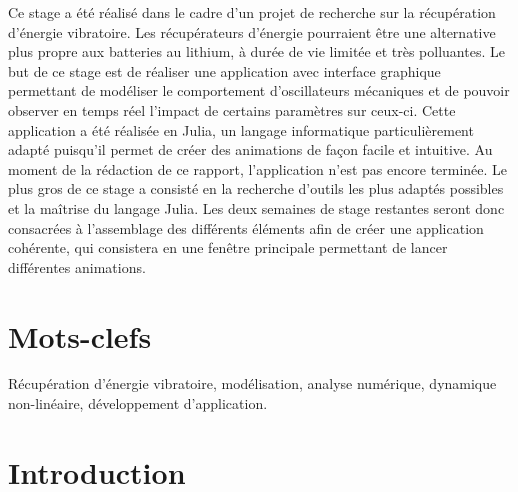 \documentclass[a4paper, french, 12pt, titlepage]{article}
\begin{document}
Ce stage a été réalisé dans le cadre d'un projet de recherche sur la récupération d'énergie vibratoire.
Les récupérateurs d'énergie pourraient être une alternative plus propre aux batteries au lithium, à durée de vie limitée et très polluantes. Le but de ce stage est de réaliser une application avec interface graphique permettant de modéliser le comportement d'oscillateurs mécaniques et de pouvoir observer en temps réel l'impact de certains paramètres sur ceux-ci.
Cette application a été réalisée en Julia, un langage informatique particulièrement adapté puisqu'il permet de créer des animations de façon facile et intuitive. Au moment de la rédaction de ce rapport, l'application n'est pas encore terminée.
Le plus gros de ce stage a consisté en la recherche d'outils les plus adaptés possibles et la maîtrise du langage Julia. Les deux semaines de stage restantes seront donc consacrées à l'assemblage des différents éléments afin de créer une application cohérente, qui consistera en une fenêtre principale permettant de lancer différentes animations.



\section*{Mots-clefs}

Récupération d'énergie vibratoire, modélisation, analyse numérique, dynamique non-linéaire, développement d'application.

\newpage

\tableofcontents

\newpage



\section{Introduction}
\end{document}
